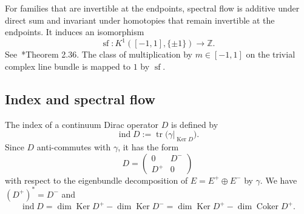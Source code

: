 \documentclass[a4paper,oneside,12pt]{amsart}
\theoremstyle{plain}
\theoremstyle{definition}
\theoremstyle{remark}
\newcommand{\Z}{\mathbb{Z}}
\DeclareMathOperator{\trace}{tr}
\DeclareMathOperator{\kernel}{Ker}
\DeclareMathOperator{\cokernel}{Coker}
\DeclareMathOperator{\indexAtiyahSinger}{ind}
\DeclareMathOperator{\spectralflow}{sf}
\begin{document}
For families that are invertible at the endpoints, spectral flow is additive under direct sum and invariant under homotopies that remain invertible at the endpoints.
It induces an isomorphism
\begin{equation}\label{equation: K1 and Z isomorphism}
  \spectralflow \colon K^1([-1,1],\{\pm 1\}) \to \Z.
\end{equation}
See~\cite{MR5076866}*{Theorem 2.36}.
The class of multiplication by $m \in [-1,1]$ on the trivial complex line bundle is mapped to $1$ by $\spectralflow$.

\subsection{Index and spectral flow}

The index of a continuum Dirac operator $D$ is defined by
\begin{equation}
  \indexAtiyahSinger D := \trace \bigl( \gamma|_{\kernel D} \bigr).
\end{equation}
Since $D$ anti-commutes with $\gamma$, it has the form
\begin{equation}
  D = \begin{pmatrix}
    0 & D^- \\
    D^+ & 0
  \end{pmatrix}
\end{equation}
with respect to the eigenbundle decomposition of $E = E^+ \oplus E^-$ by $\gamma$.
We have $(D^+)^* = D^-$ and
\begin{equation}
  \indexAtiyahSinger D = \dim \kernel D^+ - \dim \kernel D^- = \dim \kernel D^+ - \dim \cokernel D^+.
\end{equation}
\end{document}

